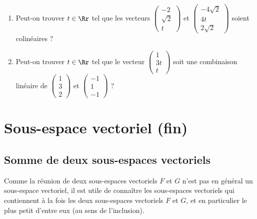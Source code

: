 \documentclass[class=report,crop=false]{standalone}
\begin{document}
\begin{miniexercices}
\sauteligne
\begin{enumerate}
\item Peut-on trouver $t\in \Rr$ tel que les vecteurs
$\left(\begin{smallmatrix}-2 \\ \sqrt2 \\ t \end{smallmatrix}\right)$ et
$\left(\begin{smallmatrix}-4\sqrt2 \\ 4t \\ 2\sqrt2 \end{smallmatrix}\right)$ soient colinéaires ?
\item Peut-on trouver $t\in \Rr$ tel que le vecteur $\left(\begin{smallmatrix}1 \\ 3t \\ t \end{smallmatrix}\right)$ soit une combinaison linéaire 
de $\left(\begin{smallmatrix} 1 \\ 3 \\ 2 \end{smallmatrix}\right)$ et $\left(\begin{smallmatrix} -1 \\ 1 \\ -1 \end{smallmatrix}\right)$ ?
\end{enumerate}
\end{miniexercices}


\section{Sous-espace vectoriel (fin)}



\subsection{Somme de deux sous-espaces vectoriels}

Comme la réunion de deux sous-espaces vectoriels $F$ et $G$
n'est pas en général un sous-espace vectoriel, il est utile de connaître
les sous-espaces vectoriels qui contiennent à la fois les deux sous-espaces
vectoriels $F$ et $G$, et en particulier le plus petit d'entre eux
(au sens de l'inclusion).
\end{document}
